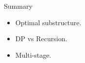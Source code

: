     \begin{frame}{Summary}
      \begin{itemize}
        \item Optimal substructure.
        \vspace{10pt}
        \item DP vs Recursion.
        \vspace{10pt}
        \item Multi-stage.
      \end{itemize}
    \end{frame}
